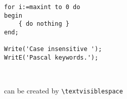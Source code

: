 \documentclass{article}
\begin{document}
\begin{lstlisting}
for i:=maxint to 0 do
begin
    { do nothing }
end;

Write('Case insensitive ');
WritE('Pascal keywords.');



\end{lstlisting}

\noindent \textvisiblespace{} can be created by \texttt{\textbackslash{}textvisiblespace}
\end{document}

